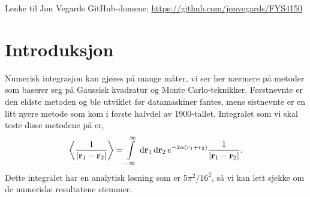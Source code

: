 \documentclass[norsk, 10pt,twocolumn]{article}
\newcommand{\dd}{\, {\text d} }
\def\mean#1{\left\langle #1 \right\rangle}
\newcommand{\mb}[1]{\mathbf{#1}}
\begin{document}
\begin{titlepage}
\begin{center}

\textsf{\Large FYS4150 - Computational Physics\\[0.5cm]
\rule{\linewidth}{0.5mm} \\[0.4cm]
{ \huge \bfseries  PROSJEKT 2}\\[0.10cm]
\rule{\linewidth}{0.5mm} \\[1.5cm]
{\Large Å løse Schrödingers likning for étt og to elektroner}}\\[1.5cm]
\textsc{}\\[1.5cm]


\textsf{\begin{minipage}{0.49\textwidth}
    \begin{center} \large
        Jon Vegard Sparre\\ \url{jonvsp@uio.no} \\[0.8cm]
    \end{center}
\end{minipage}}


\vfill

\textsf{\large{Dato: \today}}

\end{center}
\end{titlepage}


Lenke til Jon Vegards GitHub-domene: \url{https://github.com/jonvegards/FYS4150}

\section*{Introduksjon}
Numerisk integrasjon kan gjøres på mange måter, vi ser her nærmere på metoder som baserer seg på Gaussisk kvadratur og Monte Carlo-teknikker. Førstnevnte er den eldste metoden og ble utviklet før datamaskiner fantes, mens sistnevnte er en litt nyere metode som kom i første halvdel av 1900-tallet. Integralet som vi skal teste disse metodene på er,
\begin{equation}
	\mean{ \frac{1}{|\mb r_1 - \mb r_2|}} = \int\limits_{-\infty}^\infty \dd\mb r_1\dd\mb r_2\, e^{-2\alpha(r_1+r_2)} \frac{1}{|\mb r_1 - \mb r_2|}. \label{integral}
\end{equation}
Dette integralet har en analytisk løsning som er $5\pi^2/16^2$, så vi kan lett sjekke om de numeriske resultatene stemmer.
\end{document}
